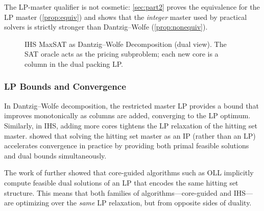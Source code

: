 The LP-master qualifier is not cosmetic: \cref{sec:part2} proves the
equivalence for the LP master (\cref{prop:equiv}) and shows that the
\emph{integer} master used by practical solvers is strictly stronger than
Dantzig--Wolfe (\cref{prop:nonequiv}).

\begin{figure}[t]
\centering
{}
\caption{IHS MaxSAT as Dantzig--Wolfe Decomposition (dual view). The SAT oracle acts as the pricing subproblem; each new core is a column in the dual packing LP.}
\label{fig:dw}
\end{figure}

\subsubsection{LP Bounds and Convergence}

In Dantzig--Wolfe decomposition, the restricted master LP provides a bound
that improves monotonically as columns are added, converging to the LP
optimum. Similarly, in IHS, adding more cores tightens the LP relaxation of
the hitting set master. \citet{davies2013exploiting} showed that solving the
hitting set master as an IP (rather than an LP) accelerates convergence
in practice by providing both primal feasible solutions and dual bounds
simultaneously.

The work of \citet{katsirelos2023analysis} further showed that core-guided
algorithms such as OLL implicitly compute feasible dual solutions of an LP
that encodes the same hitting set structure. This means that both families
of algorithms---core-guided and IHS---are optimizing over the \emph{same}
LP relaxation, but from opposite sides of duality.

